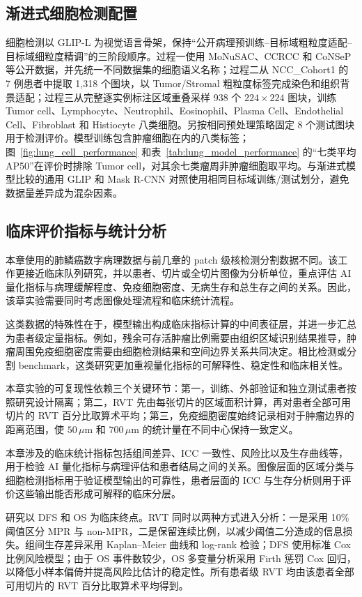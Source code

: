 \subsection{渐进式细胞检测配置}
细胞检测以 GLIP-L 为视觉语言骨架，保持“公开病理预训练--目标域粗粒度适配--目标域细粒度精调”的三阶段顺序。过程一使用 MoNuSAC、CCRCC 和 CoNSeP 等公开数据，并先统一不同数据集的细胞语义名称；过程二从 NCC\_Cohort1 的 7 例患者中提取 1,318 个图块，以 Tumor/Stromal 粗粒度标签完成染色和组织背景适配；过程三从完整逐实例标注区域重叠采样 938 个 $224\times224$ 图块，训练 Tumor cell、Lymphocyte、Neutrophil、Eosinophil、Plasma Cell、Endothelial Cell、Fibroblast 和 Histiocyte 八类细胞。另按相同预处理策略固定 8 个测试图块用于检测评价。模型训练包含肿瘤细胞在内的八类标签；图~\ref{fig:lung_cell_performance} 和表~\ref{tab:lung_model_performance} 的“七类平均 AP50”在评价时排除 Tumor cell，对其余七类瘤周非肿瘤细胞取平均。与渐进式模型比较的通用 GLIP 和 Mask R-CNN 对照使用相同目标域训练/测试划分，避免数据量差异成为混杂因素。

\subsection{临床评价指标与统计分析}
本章使用的肺鳞癌数字病理数据与前几章的 patch 级核检测分割数据不同。该工作更接近临床队列研究，并以患者、切片或全切片图像为分析单位，重点评估 AI 量化指标与病理缓解程度、免疫细胞密度、无病生存和总生存之间的关系。因此，该章实验需要同时考虑图像处理流程和临床统计流程。

这类数据的特殊性在于，模型输出构成临床指标计算的中间表征层，并进一步汇总为患者级定量指标。例如，残余可存活肿瘤比例需要由组织区域识别结果推导，肿瘤周围免疫细胞密度需要由细胞检测结果和空间边界关系共同决定。相比检测或分割 benchmark，这类研究更加重视量化指标的可解释性、稳定性和临床相关性。

本章实验的可复现性依赖三个关键环节：第一，训练、外部验证和独立测试患者按照研究设计隔离；第二，RVT 先由每张切片的区域面积计算，再对患者全部可用切片的 RVT 百分比取算术平均；第三，免疫细胞密度始终记录相对于肿瘤边界的距离范围，使 $50\,\mu\mathrm{m}$ 和 $700\,\mu\mathrm{m}$ 的统计量在不同中心保持一致定义。

本章涉及的临床统计指标包括组间差异、ICC 一致性、风险比以及生存曲线等，用于检验 AI 量化指标与病理评估和患者结局之间的关系。图像层面的区域分类与细胞检测指标用于验证模型输出的可靠性，患者层面的 ICC 与生存分析则用于评价这些输出能否形成可解释的临床分层。

研究以 DFS 和 OS 为临床终点。RVT 同时以两种方式进入分析：一是采用 10\% 阈值区分 MPR 与 non-MPR，二是保留连续比例，以减少阈值二分造成的信息损失。组间生存差异采用 Kaplan--Meier 曲线和 log-rank 检验；DFS 使用标准 Cox 比例风险模型；由于 OS 事件数较少，OS 多变量分析采用 Firth 惩罚 Cox 回归，以降低小样本偏倚并提高风险比估计的稳定性。所有患者级 RVT 均由该患者全部可用切片的 RVT 百分比取算术平均得到。

